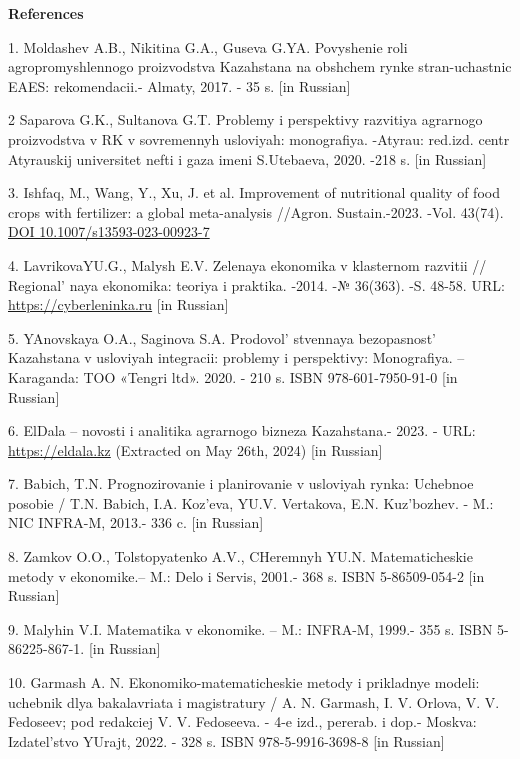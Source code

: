 \begin{center}
  {\bfseries References}
  \end{center}
  \begin{references}

1. Moldashev A.B., Nikitina G.A., Guseva G.YA. Povyshenie roli
agropromyshlennogo proizvodstva \linebreak Kazahstana na obshchem rynke
stran-uchastnic EAES: rekomendacii.- Almaty, 2017. - 35 s. {[}in
Russian{]}

2 Saparova G.K., Sultanova G.T. Problemy i perspektivy razvitiya
agrarnogo proizvodstva v RK v \linebreak sovremennyh usloviyah: monografiya.
-Atyrau: red.izd. centr Atyrauskij universitet nefti i gaza imeni
S.Utebaeva, 2020. -218 s. {[}in Russian{]}

3. Ishfaq, M., Wang, Y., Xu, J. et al. Improvement of nutritional
quality of food crops with fertilizer: a global meta-analysis //Agron.
Sustain.-2023. -Vol. 43(74).
\href{https://doi.org/10.1007/s13593-023-00923-7}{DOI
10.1007/s13593-023-00923-7}

4. LavrikovaYU.G., Malysh E.V. Zelenaya ekonomika v klasternom razvitii
// Regional' naya ekonomika: teoriya i praktika. -2014.
-№ 36(363). -S. 48-58.
URL:
\href{https://cyberleninka.ru/article/n/zelenaya-ekonomika-v-klasternom-razvitii}{https://cyberleninka.ru}
{[}in Russian{]}

5. YAnovskaya O.A., Saginova S.A. Prodovol' stvennaya
bezopasnost' Kazahstana v usloviyah integracii: problemy i perspektivy:
Monografiya. -- Karaganda: TOO «Tengri ltd». 2020. - 210 s. ISBN
978-601-7950-91-0 {[}in Russian{]}

6. ElDala -- novosti i analitika agrarnogo bizneza Kazahstana.- 2023. -
URL:
\href{https://eldala.kz/novosti/kazahstan/15357-v-kazahstane-vyroslo-kolichestvo-selhozkooperativov}{https://eldala.kz}
(Extracted on May 26th, 2024) {[}in Russian{]}

7. Babich, T.N. Prognozirovanie i planirovanie v usloviyah rynka:
Uchebnoe posobie / T.N. Babich, I.A. Koz'eva, YU.V. Vertakova, E.N.
Kuz'bozhev. - M.: NIC INFRA-M, 2013.- 336 c. {[}in Russian{]}

8. Zamkov O.O., Tolstopyatenko A.V., CHeremnyh YU.N. Matematicheskie
metody v ekonomike.-- M.: Delo i Servis, 2001.- 368 s. ISBN
5-86509-054-2 {[}in Russian{]}

9. Malyhin V.I. Matematika v ekonomike. -- M.: INFRA-M, 1999.- 355 s.
ISBN 5-86225-867-1. {[}in Russian{]}

10. Garmash A. N. Ekonomiko-matematicheskie metody i prikladnye modeli:
uchebnik dlya bakalavriata i magistratury / A. N. Garmash, I. V. Orlova,
V. V. Fedoseev; pod redakciej V. V. Fedoseeva. - 4-e izd., pererab. i
dop.- Moskva: Izdatel'stvo YUrajt, 2022. - 328 s.
ISBN 978-5-9916-3698-8 {[}in Russian{]}
\end{references}

